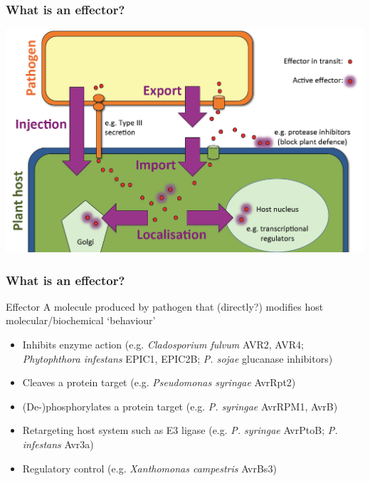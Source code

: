 
\begin{frame}
  \frametitle{What is an effector?}
  \begin{center}
    \includegraphics[width=1\textwidth]{images/effector_map}    
  \end{center}
\end{frame}

\begin{frame}
  \frametitle{What is an effector?}
  \begin{alertblock}{Effector}
    A molecule produced by pathogen that (directly?) modifies host molecular/biochemical `behaviour'
  \end{alertblock}
  \begin{itemize}
    \item \textcolor{hutton_blue}{Inhibits enzyme action} 
    {\footnotesize (e.g. \textit{Cladosporium fulvum} AVR2, AVR4; \textit{Phytophthora infestans} EPIC1, EPIC2B; \textit{P. sojae} glucanase inhibitors)}
    \item Cleaves a protein target  
      {\footnotesize (e.g. \textit{Pseudomonas syringae} AvrRpt2)}
    \item \textcolor{hutton_green}{(De-)phosphorylates a protein target}  
      {\footnotesize (e.g. \textit{P. syringae} AvrRPM1, AvrB)}
    \item Retargeting host system such as E3 ligase  
      {\footnotesize (e.g. \textit{P. syringae} AvrPtoB; \textit{P. infestans} Avr3a)}
    \item \textcolor{hutton_purple}{Regulatory control}  
      {\footnotesize (e.g. \textit{Xanthomonas campestris} AvrBs3)}
  \end{itemize}
\end{frame}

